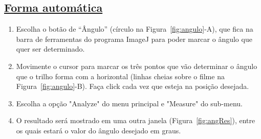 \subsection*{\underline{Forma automática}}
\vspace{-0.2cm}
\begin{enumerate}
\item Escolha o botão de “\^Angulo” (círculo na Figura~\ref{fig:angulo}-A), que fica na barra de ferramentas do programa ImageJ para poder marcar o ângulo que quer ser determinado. 
\item Movimente o cursor para marcar os três pontos que vão determinar o ângulo que o trilho forma com a horizontal (linhas cheias sobre o filme na Figura~\ref{fig:angulo}-B). Faça click cada vez que esteja na posição desejada.
\item Escolha a opção "Analyze" do menu principal e "Measure" do sub-menu.
\item O resultado será mostrado em uma outra janela (Figura~\ref{fig:angRes}), entre os quais estará o valor do ângulo desejado em graus.


\end{enumerate}
